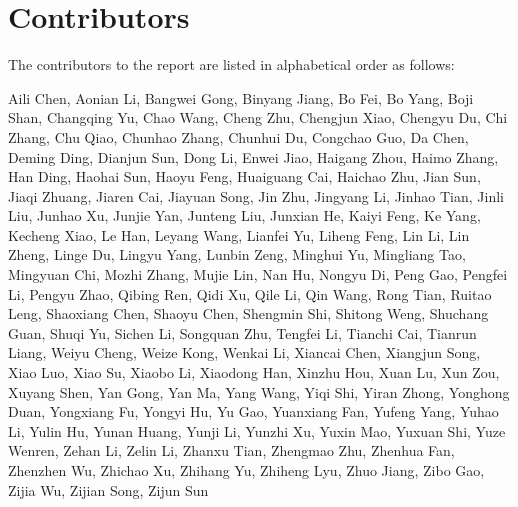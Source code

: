 \appendix 

\newpage

\section{Contributors} 
The contributors to the report are listed in alphabetical order as follows:


Aili Chen,
Aonian Li,
Bangwei Gong,
Binyang Jiang,
Bo Fei,
Bo Yang,
Boji Shan,
Changqing Yu,
Chao Wang,
Cheng Zhu,
Chengjun Xiao,
Chengyu Du,
Chi Zhang,
Chu Qiao,
Chunhao Zhang,
Chunhui Du,
Congchao Guo,
Da Chen,
Deming Ding,
Dianjun Sun,
Dong Li,
Enwei Jiao,
Haigang Zhou,
Haimo Zhang,
Han Ding,
Haohai Sun,
Haoyu Feng,
Huaiguang Cai,
Haichao Zhu,
Jian Sun,
Jiaqi Zhuang,
Jiaren Cai,
Jiayuan Song,
Jin Zhu,
Jingyang Li,
Jinhao Tian,
Jinli Liu,
Junhao Xu,
Junjie Yan,
Junteng Liu,
Junxian He,
Kaiyi Feng,
Ke Yang,
Kecheng Xiao,
Le Han,
Leyang Wang,
Lianfei Yu,
Liheng Feng,
Lin Li,
Lin Zheng,
Linge Du,
Lingyu Yang,
Lunbin Zeng,
Minghui Yu,
Mingliang Tao,
Mingyuan Chi,
Mozhi Zhang,
Mujie Lin,
Nan Hu,
Nongyu Di,
Peng Gao,
Pengfei Li,
Pengyu Zhao,
Qibing Ren,
Qidi Xu,
Qile Li,
Qin Wang,
Rong Tian,
Ruitao Leng,
Shaoxiang Chen,
Shaoyu Chen,
Shengmin Shi,
Shitong Weng,
Shuchang Guan,
Shuqi Yu,
Sichen Li,
Songquan Zhu,
Tengfei Li,
Tianchi Cai,
Tianrun Liang,
Weiyu Cheng,
Weize Kong,
Wenkai Li,
Xiancai Chen,
Xiangjun Song,
Xiao Luo,
Xiao Su,
Xiaobo Li,
Xiaodong Han,
Xinzhu Hou,
Xuan Lu,
Xun Zou,
Xuyang Shen,
Yan Gong,
Yan Ma,
Yang Wang,
Yiqi Shi,
Yiran Zhong,
Yonghong Duan,
Yongxiang Fu,
Yongyi Hu,
Yu Gao,
Yuanxiang Fan,
Yufeng Yang,
Yuhao Li,
Yulin Hu,
Yunan Huang,
Yunji Li,
Yunzhi Xu,
Yuxin Mao,
Yuxuan Shi,
Yuze Wenren,
Zehan Li,
Zelin Li,
Zhanxu Tian,
Zhengmao Zhu,
Zhenhua Fan,
Zhenzhen Wu,
Zhichao Xu,
Zhihang Yu,
Zhiheng Lyu,
Zhuo Jiang,
Zibo Gao,
Zijia Wu,
Zijian Song,
Zijun Sun


































